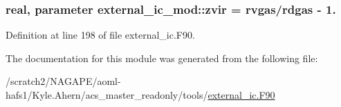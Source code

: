 \subsubsection[{zvir}]{\setlength{\rightskip}{0pt plus 5cm}real, parameter external\-\_\-ic\-\_\-mod\-::zvir = rvgas/rdgas -\/ 1.\hspace{0.3cm}{\ttfamily [private]}}\label{classexternal__ic__mod_ae145645946e5e06d6f5af880aaff9b1e}


Definition at line 198 of file external\-\_\-ic.\-F90.



The documentation for this module was generated from the following file\-:\begin{DoxyCompactItemize}
\item 
/scratch2/\-N\-A\-G\-A\-P\-E/aoml-\/hafs1/\-Kyle.\-Ahern/acs\-\_\-master\-\_\-readonly/tools/\hyperlink{external__ic_8F90}{external\-\_\-ic.\-F90}\end{DoxyCompactItemize}
